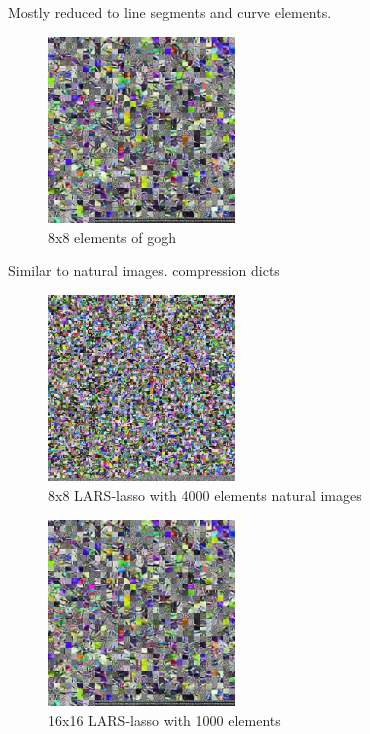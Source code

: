 Mostly reduced to line segments and curve elements.

\begin{figure}[h]
\centering
\includegraphics[width = 0.44\textwidth]{images/16_1000_1000_10_lasso.png}
\caption{8x8 elements of gogh}
\label{fig:16_1000_lasso}
\end{figure}

Similar to natural images.
compression dicts

\begin{figure}[h]
\centering
\includegraphics[width = 0.44\textwidth]{images/8_4000_10000_10_lasso.png} 
\caption{8x8 LARS-lasso with 4000 elements natural images}
\label{fig:8_4000_lasso}
\end{figure}


\begin{figure}[h]
\centering
\includegraphics[width = 0.44\textwidth]{images/16_1000_1000_10_lasso.png}
\caption{16x16 LARS-lasso with 1000 elements}
\label{fig:16_1000_lasso}
\end{figure}

